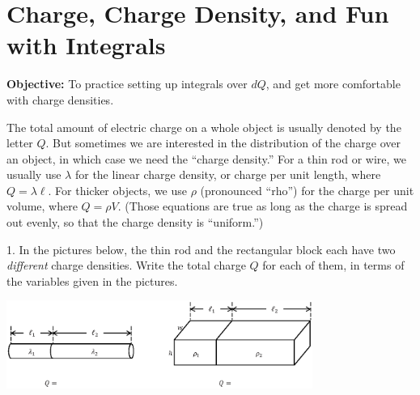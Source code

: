 \section{Charge, Charge Density, and Fun with Integrals}

\makelabheader %

\vspace{0.1in}
\textbf{Objective:} To practice setting up integrals over $dQ$, and get more comfortable with charge densities.

\vspace{0.1in}
The total amount of electric charge on a whole object is usually denoted by the letter $Q$. But sometimes we are interested in the distribution of the charge over an object, in which case we need the ``charge density.''  For a thin rod or wire, we usually use $\lambda$ for the linear charge density, or charge per unit length, where $Q = \lambda \ell$. For thicker objects, we use $\rho$ (pronounced ``rho'') for the charge per unit volume, where $Q = \rho V$.  (Those equations are true as long as the charge is spread out evenly, so that the charge density is ``uniform.'')

1. In the pictures below, the thin rod and the rectangular block each have two \textit{different} charge densities.  Write the total charge $Q$ for each of them, in terms of the variables given in the pictures.
\begin{center}
\includegraphics[width=0.75\textwidth]{charge_density/fig1.eps}
\end{center}

